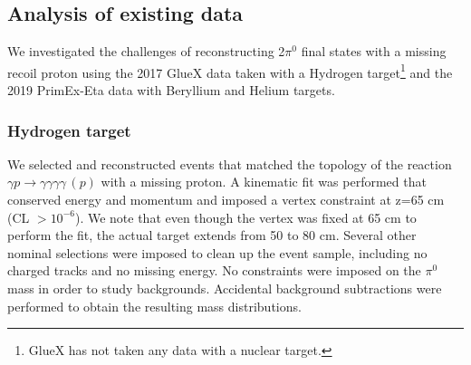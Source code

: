 
\subsection{Analysis of existing data}
We investigated the challenges of reconstructing 2$\pi^0$ final states
with a missing recoil proton using the 2017 GlueX data taken with a
Hydrogen target\footnote{GlueX has not taken any data with a nuclear
  target.} and the 2019 PrimEx-Eta data with Beryllium and Helium targets.
\subsubsection*{Hydrogen target}
  We selected and reconstructed events that matched the
topology of the reaction $\gamma p\rightarrow \gamma \gamma \gamma
\gamma\, (p)$ with a missing proton. A kinematic fit was performed
that conserved energy and momentum and imposed a vertex constraint at
z=65 cm (CL $> 10^{-6}$). We note that even though the vertex was
fixed at 65 cm to perform the fit, the actual target extends from 50
to 80 cm. Several other nominal selections were imposed to clean up
the event sample, including no charged tracks and no missing
energy. No constraints were imposed on the $\pi^0$ mass in order to
study backgrounds. Accidental background subtractions were performed
to obtain the resulting mass distributions.
